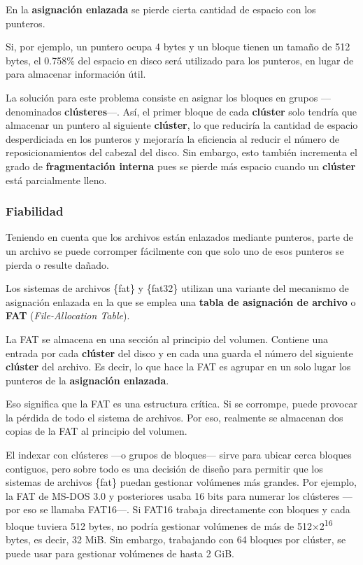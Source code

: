 En la \textbf{asignación enlazada} se pierde cierta cantidad de espacio
con los punteros.

Si, por ejemplo, un puntero ocupa 4 bytes y un bloque tienen un tamaño
de 512 bytes, el 0.758\% del espacio en disco será utilizado para los
punteros, en lugar de para almacenar información útil.

La solución para este problema consiste en asignar los bloques en grupos
---denominados \textbf{clústeres}{}---. Así, el primer bloque de cada
\textbf{clúster} solo tendría que almacenar un puntero al siguiente
\textbf{clúster}, lo que reduciría la cantidad de espacio desperdiciada
en los punteros y mejoraría la eficiencia al reducir el número de
reposicionamientos del cabezal del disco. Sin embargo, esto también
incrementa el grado de \textbf{fragmentación interna} pues se pierde más
espacio cuando un \textbf{clúster} está parcialmente lleno.

\subsubsection{Fiabilidad}\label{_fiabilidad}

Teniendo en cuenta que los archivos están enlazados mediante punteros,
parte de un archivo se puede corromper fácilmente con que solo uno de
esos punteros se pierda o resulte dañado.

Los sistemas de archivos \{fat\} y \{fat32\} utilizan una variante del
mecanismo de asignación enlazada en la que se emplea una \textbf{tabla
de asignación de archivo}{} o \textbf{{}FAT} (\emph{File-Allocation
Table}).

La FAT se almacena en una sección al principio del volumen. Contiene una
entrada por cada \textbf{clúster} del disco y en cada una guarda el
número del siguiente \textbf{clúster} del archivo. Es decir, lo que hace
la FAT es agrupar en un solo lugar los punteros de la \textbf{asignación
enlazada}.

Eso significa que la FAT es una estructura crítica. Si se corrompe,
puede provocar la pérdida de todo el sistema de archivos. Por eso,
realmente se almacenan dos copias de la FAT al principio del volumen.

El indexar con clústeres ---o grupos de bloques--- sirve para ubicar
cerca bloques contiguos, pero sobre todo es una decisión de diseño para
permitir que los sistemas de archivos \{fat\} puedan gestionar volúmenes
más grandes. Por ejemplo, la FAT de MS-DOS 3.0 y posteriores usaba 16
bits para numerar los clústeres ---por eso se llamaba FAT16---. Si FAT16
trabaja directamente con bloques y cada bloque tuviera 512 bytes, no
podría gestionar volúmenes de más de 512×2\textsuperscript{16} bytes, es
decir, 32 MiB. Sin embargo, trabajando con 64 bloques por clúster, se
puede usar para gestionar volúmenes de hasta 2 GiB.

